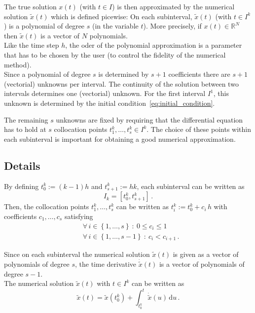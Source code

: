 \documentclass{scrartcl}
\begin{document}
The true solution $x(t)$ (with $t \in I$) is then approximated
by the numerical solution $\tilde{x}(t)$ which is defined picewise:
On each subinterval,
$\tilde{x}(t)$ (with $t \in I^k$) is a polynomial of degree $s$ (in the variable $t$).
More precisely,
if $x(t) \in \mathbb{R}^N$ then $\tilde{x}(t)$ is a vector of $N$ polynomials. \\

Like the time step $h$,
the oder of the polynomial approximation is a parameter
that has to be chosen by the user (to control the fidelity of the numerical method). \\

Since a polynomial of degree $s$ is determined by $s+1$ coefficients
there are $s+1$ (vectorial) unknowns per interval.
The continuity of the solution between two intervals determines one (vectorial) unknown.
For the first interval $I^1$,
this unknown is determined by the initial condition~\eqref{eq:initial_condition}.

The remaining $s$ unknowns are fixed by requiring that
the differential equation has to hold
at $s$ collocation points $t_1^k, \ldots, t_s^k \in I^k$.
The choice of these points within each subinterval is important
for obtaining a good numerical approximation.


\subsection{Details}

By defining
$t_0^k := \left( k-1 \right) h$ and $t_{s+1}^k := hk$,
each subinterval can be written as
\begin{equation*}
	I_k = \left[ t_0^k, t_{s+1}^k \right]
	\,.
\end{equation*}
Then, the collocation points $t_1^k, \ldots, t_s^k$ can be written as
$t_i^k := t_0^k + c_i \, h$
with coefficients $c_1, \ldots, c_s$
satisfying
\begin{align*}
	&\forall \, i \in \left\{ 1, \ldots, s \right\} \: \colon \: 0 \leq c_i \leq 1 \\
	&\forall \, i \in \left\{ 1, \ldots, s-1 \right\} \: \colon \: c_i < c_{i+1} \,.
\end{align*}

Since on each subinterval the numerical solution $\tilde{x}(t)$
is given as a vector of polynomials of degree $s$,
the time derivative $\dot{\tilde{x}}(t)$ is a vector of polynomials of degree $s-1$. \\

The numerical solution $\tilde{x}(t)$ with $t \in I^k$ can be written as
\begin{equation}
	\tilde{x}(t) =
	\tilde{x}(t_0^k) + \int_{t_0^k}^t \dot{\tilde{x}}(u) \, \mathrm{d}u
	\,.
	\label{eq:numerical_solution}
\end{equation}
\end{document}
